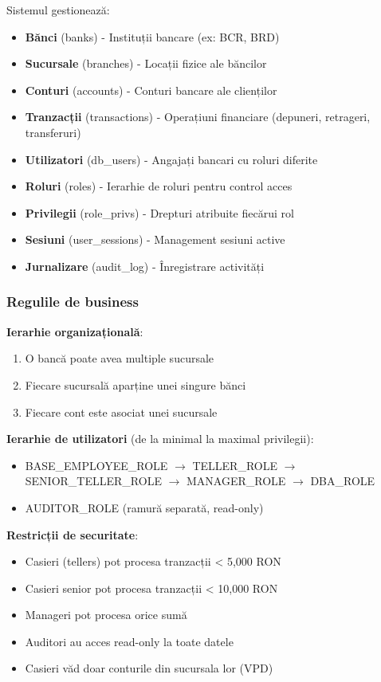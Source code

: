 \documentclass[12pt,a4paper]{article}
\begin{document}
Sistemul gestionează:
\begin{itemize}
    \item \textbf{Bănci} (banks) - Instituții bancare (ex: BCR, BRD)
    \item \textbf{Sucursale} (branches) - Locații fizice ale băncilor
    \item \textbf{Conturi} (accounts) - Conturi bancare ale clienților
    \item \textbf{Tranzacții} (transactions) - Operațiuni financiare (depuneri, retrageri, transferuri)
    \item \textbf{Utilizatori} (db\_users) - Angajați bancari cu roluri diferite
    \item \textbf{Roluri} (roles) - Ierarhie de roluri pentru control acces
    \item \textbf{Privilegii} (role\_privs) - Drepturi atribuite fiecărui rol
    \item \textbf{Sesiuni} (user\_sessions) - Management sesiuni active
    \item \textbf{Jurnalizare} (audit\_log) - Înregistrare activități
\end{itemize}

\subsubsection{Regulile de business}

\textbf{Ierarhie organizațională}:
\begin{enumerate}
    \item O bancă poate avea multiple sucursale
    \item Fiecare sucursală aparține unei singure bănci
    \item Fiecare cont este asociat unei sucursale
\end{enumerate}

\textbf{Ierarhie de utilizatori} (de la minimal la maximal privilegii):
\begin{itemize}
    \item BASE\_EMPLOYEE\_ROLE $\rightarrow$ TELLER\_ROLE $\rightarrow$ SENIOR\_TELLER\_ROLE $\rightarrow$ MANAGER\_ROLE $\rightarrow$ DBA\_ROLE
    \item AUDITOR\_ROLE (ramură separată, read-only)
\end{itemize}

\textbf{Restricții de securitate}:
\begin{itemize}
    \item Casieri (tellers) pot procesa tranzacții < 5,000 RON
    \item Casieri senior pot procesa tranzacții < 10,000 RON
    \item Manageri pot procesa orice sumă
    \item Auditori au acces read-only la toate datele
    \item Casieri văd doar conturile din sucursala lor (VPD)
\end{itemize}
\end{document}
